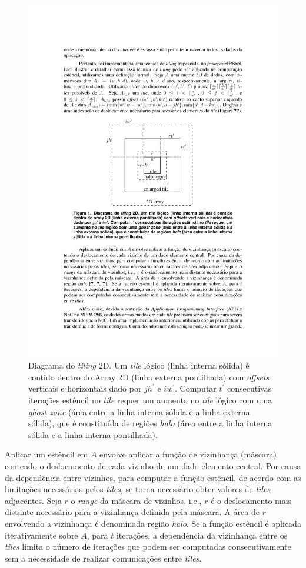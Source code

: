 \documentclass[12pt]{article}
\begin{document}
\begin{figure}[t]
\centering
\includegraphics[width=0.3\columnwidth]{figs/tile.pdf}
\caption{ Diagrama do \textit{tiling} 2D. Um \textit{tile} lógico (linha interna sólida) é contido dentro do Array
    2D (linha externa pontilhada) com \textit{offsets} verticais e horizontais dado por $j  h^\prime$
    e $i  w^\prime$. Computar $t^\prime$ consecutivas iterações estêncil no \textit{tile} requer um aumento no
    \textit{tile} lógico com uma \textit{ghost zone} (área entre a linha interna sólida e a linha externa sólida), que é constituída
    de regiões \textit{halo} (área entre a linha interna sólida e a linha interna pontilhada).}
\label{fig:gputile}
\end{figure}

Aplicar um estêncil em $A$ envolve aplicar a função de vizinhança (máscara)
contendo o deslocamento de cada vizinho de um dado elemento central. Por causa
da dependência entre vizinhos, para computar a função estêncil, de acordo com as
limitações necessárias pelos \textit{tiles}, se torna necessário obter valores
de \textit{tiles} adjacentes. Seja $r$ o \textit{range} da máscara de vizinhos,
i.e., $r$ é o deslocamento mais distante necessário para a vizinhança definida
pela máscara. A área de $r$ envolvendo a vizinhança é denominada região
\textit{halo}. Se a função estêncil é aplicada iterativamente sobre $A$, para
$t$ iterações, a dependência da vizinhança entre os \textit{tiles} limita o
número de iterações que podem ser computadas consecutivamente sem a necessidade
de realizar comunicações entre \textit{tiles}.
\end{document}
